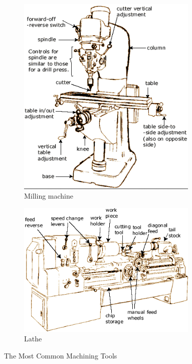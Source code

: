 \documentclass[10pt,letterpaper]{book}
\begin{document}
\begin{figure}[H]
\begin{subfigure}[b]{.34\linewidth}
		\includegraphics[width=0.95\textwidth]{imgs/mill.png}
		\caption{Milling machine}
	\end{subfigure}	\begin{subfigure}[b]{.4\linewidth}
		\includegraphics[width=0.95\textwidth]{imgs/lathe.png}
		\caption{Lathe}
	\end{subfigure}	
	
	\caption{The Most Common Machining Tools}
\end{figure}
\end{document}
